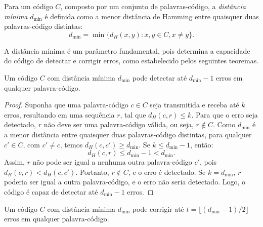 \begin{definition}
Para um código $C$, composto por um conjunto de palavras-código, a \emph{distância
mínima} $d_{\text{min}}$ é definida como a menor distância de Hamming entre
quaisquer duas palavras-código distintas:
\begin{equation}
d_{\text{min}} = \min \{ d_H(x, y) : x, y \in C, x \neq y \}.
\end{equation}
\end{definition}

A distância mínima é um parâmetro fundamental, pois determina a capacidade do
código de detectar e corrigir erros, como estabelecido pelos seguintes
teoremas.

\begin{theorem}\label{thm:deteccaoerros}
Um código $C$ com distância mínima $d_{\text{min}}$ pode detectar até $d_{\text{min}} - 1$ erros em qualquer palavra-código.
\end{theorem}
\begin{proof}
Suponha que uma palavra-código $c \in C$ seja transmitida e receba até $k$ erros,
resultando em uma sequência $r$, tal que $d_H(c, r) \leq k$.
Para que o erro seja detectado, $r$ não deve ser uma palavra-código válida,
ou seja, $r \notin C$. Como $d_{\text{min}}$ é a menor distância entre quaisquer
duas palavras-código distintas, para qualquer $c' \in C$, com $c' \neq c$, 
temos $d_H(c, c') \geq d_{\text{min}}$. Se $k \leq d_{\text{min}} - 1$, então:
\begin{equation}
d_H(c, r) \leq d_{\text{min}} - 1 < d_{\text{min}}.
\end{equation}
Assim, $r$ não pode ser igual a nenhuma outra palavra-código $c'$, pois 
$d_H(c, r) < d_H(c, c')$. Portanto, $r \notin C$, e o erro é detectado.
Se $k = d_{\text{min}}$, $r$ poderia ser igual a outra palavra-código,
e o erro não seria detectado. Logo, o código é capaz de detectar até $d_{\text{min}} - 1$ erros.
\end{proof}

\begin{theorem}\label{thm:correcaoerros} 
Um código $C$ com distância mínima $d_{\text{min}}$ pode corrigir até
$t = \lfloor (d_{\text{min}} - 1)/2 \rfloor$ erros em qualquer palavra-código.
\end{theorem}

